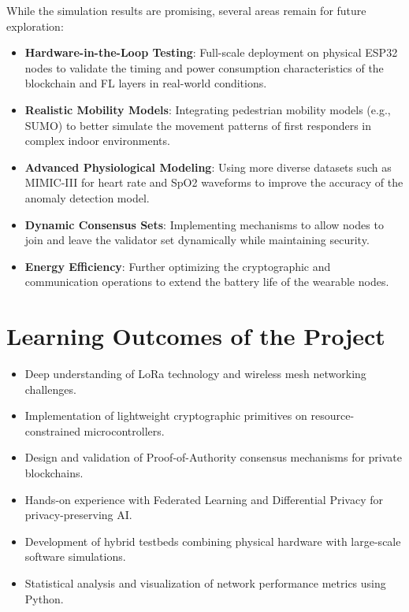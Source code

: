 While the simulation results are promising, several areas remain for future exploration:
\begin{itemize}
\item \textbf{Hardware-in-the-Loop Testing}: Full-scale deployment on physical ESP32 nodes to validate the timing and power consumption characteristics of the blockchain and FL layers in real-world conditions.
\item \textbf{Realistic Mobility Models}: Integrating pedestrian mobility models (e.g., SUMO) to better simulate the movement patterns of first responders in complex indoor environments.
\item \textbf{Advanced Physiological Modeling}: Using more diverse datasets such as MIMIC-III for heart rate and SpO2 waveforms to improve the accuracy of the anomaly detection model.
\item \textbf{Dynamic Consensus Sets}: Implementing mechanisms to allow nodes to join and leave the validator set dynamically while maintaining security.
\item \textbf{Energy Efficiency}: Further optimizing the cryptographic and communication operations to extend the battery life of the wearable nodes.
\end{itemize}

\section{Learning Outcomes of the Project}

\begin{itemize}
\item Deep understanding of LoRa technology and wireless mesh networking challenges.
\item Implementation of lightweight cryptographic primitives on resource-constrained microcontrollers.
\item Design and validation of Proof-of-Authority consensus mechanisms for private blockchains.
\item Hands-on experience with Federated Learning and Differential Privacy for privacy-preserving AI.
\item Development of hybrid testbeds combining physical hardware with large-scale software simulations.
\item Statistical analysis and visualization of network performance metrics using Python.
\end{itemize}
